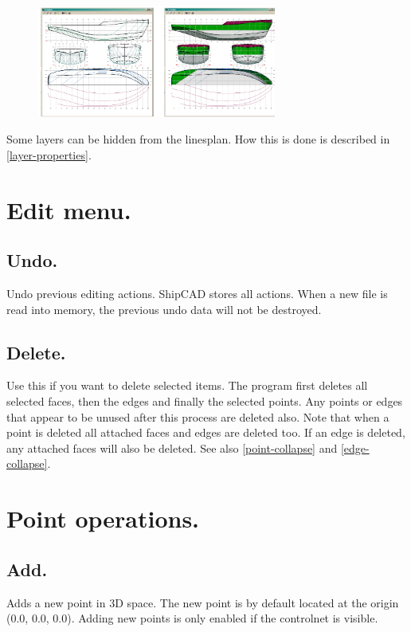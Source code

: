 \documentclass[12pt]{article}
\begin{document}
\begin{figure}
        \centering
        \includegraphics[width=0.7\textwidth,natwidth=867,natheight=405]{linesplan.png}
        \caption{}
        \label{fig:linesplan}
\end{figure}

Some layers can be hidden from the linesplan. How this is done is
described in
\ref{layer-properties}.

\section{Edit menu.}

\subsection{Undo.}
Undo previous editing actions. ShipCAD stores all actions. When a new
file is read into memory, the previous undo data will not be
destroyed.

\subsection{Delete.}
Use this if you want to delete selected items. The program first
deletes all selected faces, then the edges and finally the selected
points. Any points or edges that appear to be unused after this
process are deleted also. Note that when a point is deleted all
attached faces and edges are deleted too. If an edge is deleted, any
attached faces will also be deleted. See also \ref{point-collapse}
and \ref{edge-collapse}.

\section{Point operations.}

\subsection{Add.}
Adds a new point in 3D space. The new point is by default located at the origin (0.0, 0.0, 0.0).
Adding new points is only enabled if the controlnet is visible.
\end{document}
